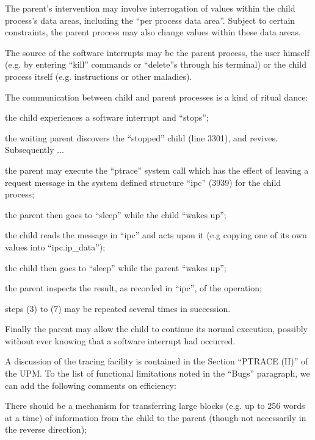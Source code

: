 The parent's intervention may involve
interrogation of values within the
child process's data areas, including
the ``per process data area''. Subject to
certain constraints, the parent process
may also change values within these
data areas.


The source of the software interrupts
may be the parent process, the user
himself (e.g. by entering ``kill''
commands or ``delete''s through his terminal)
or the child process itself (e.g.
instructions or other maladies).

The communication between child and
parent processes is a kind of ritual
dance:

\bd
\item[(1)] the child experiences a software
 interrupt and ``stops'';

\item[(2)] the waiting parent discovers
 the ``stopped'' child (line 3301), and
revives. Subsequently ...

\item[(3)] the parent may execute the
 ``ptrace'' system call which has
 the effect of leaving a request
 message in the system defined
 structure ``ipc'' (3939) for the
 child process;

\item[(4)] the parent then goes to ``sleep''
 while the child ``wakes up'';

\item[(5)] the child reads the message in
``ipc'' and acts upon it (e.g copying
one of its own values into
``ipc.ip\_data'');

\item[(6)] the child then goes to ``sleep''
 while the parent ``wakes up'';

\item[(7)] the parent inspects the result,
as recorded in ``ipc'', of the
operation;

\item[(8)] steps (3) to (7) may be repeated
 several times in succession.
\ed

Finally the parent may allow the child
to continue its normal execution, possibly without ever knowing that a
software interrupt had occurred.

A discussion of the tracing facility is
contained in the Section ``PTRACE (II)''
of the UPM. To the list of functional
limitations noted in the ``Bugs''
paragraph, we can add the following comments on efficiency:

\bi
\item There should be a mechanism for
 transferring large blocks (e.g.
 up to 256 words at a time) of
 information from the child to
 the parent (though not necessarily in the reverse direction);

